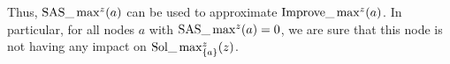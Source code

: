 Thus, $\mathrm{SAS}\_\max^z(a)$ can be used to approximate $\mathrm{Improve}\_\max^z(a)$. 
In particular, for all nodes $a$ with $\mathrm{SAS}\_\max\nolimits^z(a)=0$, 
we are sure that this node is not having any impact on $\mathrm{Sol}\_\max_{\{a\}}^z(z)$. 

	
%	
	
% 			


 



